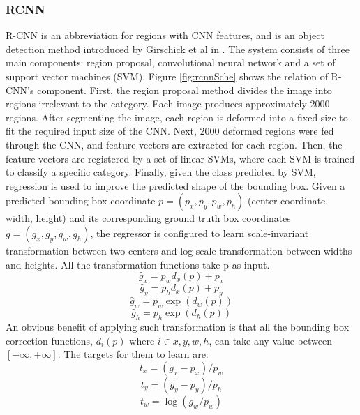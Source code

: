 \subsubsection{RCNN}
R-CNN is an abbreviation for regions with CNN features, and is an object detection method introduced by Girschick et al in \cite{DBLP:journals/corr/GirshickDDM13}. The system consists of three main components: region proposal, convolutional neural network and a set of support vector machines (SVM).
Figure \ref{fig:rcnnSche} shows the relation of R-CNN's component. First, the region proposal method divides the image into regions irrelevant to the category. Each image produces approximately 2000 regions. After segmenting the image, each region is deformed into a fixed size to fit the required input size of the CNN. Next, 2000 deformed regions were fed through the CNN, and feature vectors are extracted for each region. Then, the feature vectors are registered by a set of linear SVMs, where each SVM is trained to classify a specific category. Finally, given the class predicted by SVM, regression is used to improve the predicted shape of the bounding box. Given a predicted bounding box coordinate \(p=(p_x,p_y,p_w,p_h)\) (center coordinate, width, height) and its corresponding ground truth box coordinates \(g=(g_x,g_y,g_w,g_h )\), the regressor is configured to learn scale-invariant transformation between two centers and log-scale transformation between widths and heights. All the transformation functions take p as input.
\begin{equation}
	\hat g_x=p_w d_x (p)+p_x
\end{equation}
\begin{equation}
	\hat g_y=p_h d_x (p)+p_y
\end{equation}
\begin{equation}
	\hat g_w=p_w \exp{(d_w(p))}
\end{equation}
\begin{equation}
	\hat g_h=p_h \exp{(d_h(p))}
\end{equation}
An obvious benefit of applying such transformation is that all the bounding box correction functions, \(d_i (p)\) where \( i\in {x,y,w,h}\), can take any value between \([-\infty,+\infty]\). The targets for them to learn are:
\begin{equation}
	t_x=(g_x-p_x )/p_w
\end{equation}
\begin{equation}
	t_y=(g_y-p_y )/p_h
\end{equation}
\begin{equation}
	t_w=\log{(g_w/p_w)} 
\end{equation}
